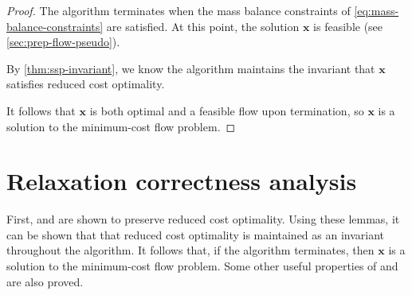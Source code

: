 \sspcorrectness*
\begin{proof}
    The algorithm terminates when the mass balance constraints of \cref{eq:mass-balance-constraints} are satisfied. At this point, the solution $\mathbf{x}$ is feasible (see \cref{sec:prep-flow-pseudo}). 
    
    By \cref{thm:ssp-invariant}, we know the algorithm maintains the invariant that $\mathbf{x}$ satisfies reduced cost optimality. 
    
    It follows that $\mathbf{x}$ is both optimal and a feasible flow upon termination, so $\mathbf{x}$ is a solution to the minimum-cost flow problem.
\end{proof}

\section{Relaxation correctness analysis} \label{appendix:impl-relaxation-correctness}

First,  and  are shown to preserve reduced cost optimality. Using these lemmas, it can be shown that that reduced cost optimality is maintained as an invariant throughout the algorithm. It follows that, if the algorithm terminates, then $\mathbf{x}$ is a solution to the minimum-cost flow problem. Some other useful properties of  and  are also proved.\\

